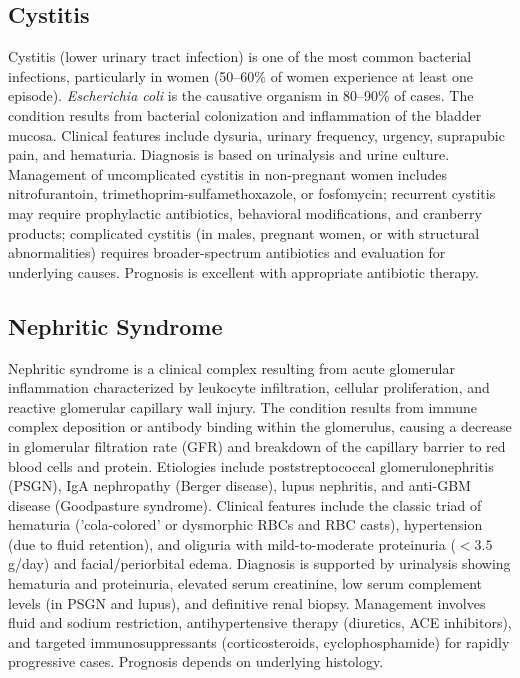 \subsection{Cystitis}
\label{sec:Cystitis}
Cystitis (lower urinary tract infection) is one of the most common bacterial infections, particularly in women (50--60\% of women experience at least one episode). \textit{Escherichia coli} is the causative organism in 80--90\% of cases. The condition results from bacterial colonization and inflammation of the bladder mucosa. Clinical features include dysuria, urinary frequency, urgency, suprapubic pain, and hematuria. Diagnosis is based on urinalysis and urine culture. Management of uncomplicated cystitis in non-pregnant women includes nitrofurantoin, trimethoprim-sulfamethoxazole, or fosfomycin; recurrent cystitis may require prophylactic antibiotics, behavioral modifications, and cranberry products; complicated cystitis (in males, pregnant women, or with structural abnormalities) requires broader-spectrum antibiotics and evaluation for underlying causes. Prognosis is excellent with appropriate antibiotic therapy.

\subsection{Nephritic Syndrome}
\label{sec:Nephritic Syndrome}
Nephritic syndrome is a clinical complex resulting from acute glomerular inflammation characterized by leukocyte infiltration, cellular proliferation, and reactive glomerular capillary wall injury. The condition results from immune complex deposition or antibody binding within the glomerulus, causing a decrease in glomerular filtration rate (GFR) and breakdown of the capillary barrier to red blood cells and protein. Etiologies include poststreptococcal glomerulonephritis (PSGN), IgA nephropathy (Berger disease), lupus nephritis, and anti-GBM disease (Goodpasture syndrome). Clinical features include the classic triad of hematuria ('cola-colored' or dysmorphic RBCs and RBC casts), hypertension (due to fluid retention), and oliguria with mild-to-moderate proteinuria ($<3.5$ g/day) and facial/periorbital edema. Diagnosis is supported by urinalysis showing hematuria and proteinuria, elevated serum creatinine, low serum complement levels (in PSGN and lupus), and definitive renal biopsy. Management involves fluid and sodium restriction, antihypertensive therapy (diuretics, ACE inhibitors), and targeted immunosuppressants (corticosteroids, cyclophosphamide) for rapidly progressive cases. Prognosis depends on underlying histology.

